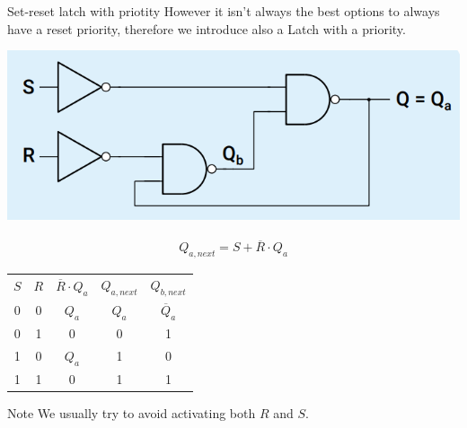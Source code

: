     
    \begin{parag}{Set-reset latch with  priotity}
      However it isn't always the best options to always have a reset priority, therefore we introduce also a Latch with a  priority.
      \begin{center}
          \includegraphics[scale=0.6]{12025-06-20.png}
      \end{center}
      \begin{align*} Q_{a, next} =  S + \overline{R}\cdot Q_a \end{align*}
      \begin{center} \begin{tabular}{cc|c|cc}$S$ & $R$ & $\overline{R}\cdot Q_a$ & $Q_{a, next}$ & $Q_{b, next}$ \\ 0 & 0 & $Q_a$ & $Q_a$ & $\overline{Q}_a$ \\ 0 & 1 & 0 & 0 & 1 \\ 1 & 0 & $Q_a$ & 1 & 0 \\ 1 & 1 & 0 & 1 & 1 \end{tabular} \end{center} 

      \begin{subparag}{Note}
         We usually try to avoid activating both $R$ and $S$.
      \end{subparag}
        
    \end{parag}
    
